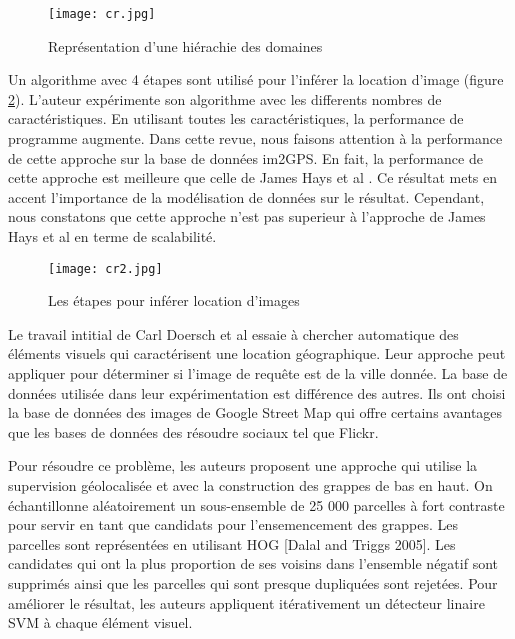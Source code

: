 \documentclass[journal]{IEEEtran}
\begin{document}
\begin{figure}[t]
    \centering
    \texttt{[image: cr.jpg]}
    \caption{Représentation d'une hiérachie des domaines}
    \label{fig:hi}
\end{figure}

Un algorithme avec 4 étapes sont utilisé pour l'inférer la location d'image (figure 
\ref{fig:eta}). L'auteur expérimente son algorithme avec les differents nombres de 
caractéristiques. En utilisant toutes les caractéristiques, la performance de programme 
augmente. Dans cette revue, nous faisons attention à la performance de cette approche sur 
la base de données im2GPS. En fait, la performance de cette approche est meilleure que 
celle de James Hays et al \cite{Hays:2008:im2gps}. Ce résultat mets en accent 
l'importance de la modélisation de données sur le résultat. Cependant, nous constatons 
que cette approche n'est pas superieur à l'approche de James Hays et al 
\cite{Hays:2008:im2gps} en terme de scalabilité.

\begin{figure}[t]
    \centering
    \texttt{[image: cr2.jpg]}
    \caption{Les étapes pour inférer location d'images} %
    \label{fig:eta}
\end{figure}
    
Le travail intitial de Carl Doersch et al \cite{doersch2012what} essaie  à chercher 
automatique des éléments visuels qui caractérisent une location géographique. Leur 
approche peut appliquer pour déterminer si l'image de requête est de la ville donnée. La 
base de données utilisée dans leur expérimentation est différence des autres. Ils ont 
choisi la base de données des images de Google Street Map qui offre certains avantages 
que les bases de données des résoudre sociaux tel que Flickr. 

Pour résoudre ce problème, les auteurs proposent une approche qui utilise la supervision 
géolocalisée et avec la construction des grappes de bas en haut.
On échantillonne aléatoirement un sous-ensemble de 25 000 parcelles à fort
contraste pour servir en tant que candidats pour l'ensemencement des grappes.
Les parcelles sont représentées en utilisant HOG [Dalal and
Triggs 2005]. Les candidates qui ont la plus proportion de ses voisins dans
l'ensemble négatif sont supprimés ainsi que les parcelles qui sont presque dupliquées
sont rejetées.
Pour améliorer le résultat, les auteurs appliquent itérativement un détecteur linaire SVM 
à chaque élément visuel. %
\end{document}
